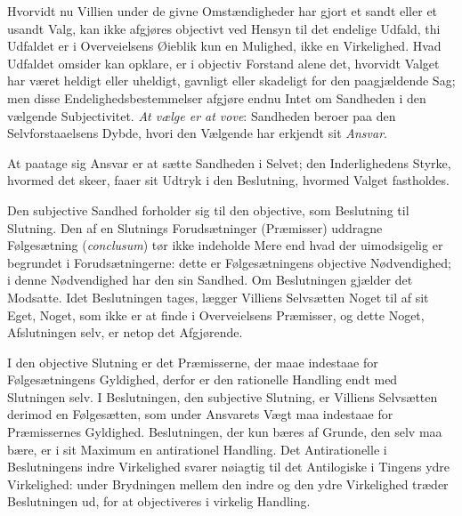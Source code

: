 \documentclass[12pt]{book}
\newcommand{\opage}[1]{\marginnote{\footnotesize\textit{[#1]}}}
\begin{document}
Hvorvidt nu Villien under de givne Omstændigheder har gjort et sandt
eller et usandt Valg, kan ikke afgjøres objectivt ved Hensyn til det
endelige Udfald, thi Udfaldet er i Overveielsens Øieblik kun en
Mulighed, ikke en Virkelighed. Hvad Udfaldet omsider kan opklare, er
i objectiv Forstand alene det, hvorvidt Valget har været heldigt
eller uheldigt, gavnligt eller skadeligt for den paagjældende Sag;
men disse Endelighedsbestemmelser afgjøre endnu Intet om Sandheden i
den vælgende Subjectivitet. \emph{At vælge er at vove}: Sandheden
beroer paa den Selvforstaaelsens Dybde, hvori den Vælgende har
erkjendt sit \emph{Ansvar}.

At paatage sig Ansvar er at sætte Sandheden i Selvet; den
Inderlighedens Styrke, hvormed det skeer, faaer sit Udtryk i den
Beslutning, hvormed Valget fastholdes.

Den subjective Sandhed forholder sig til den objective, som
Beslutning til Slutning. Den af en Slutnings Forudsætninger
(Præmisser) uddragne Følgesætning (\textit{conclusum}) tør ikke
indeholde Mere end hvad der uimodsigelig er begrundet i
Forudsætningerne: dette er Følgesætningens objective Nødvendighed; i
denne Nødvendighed har den sin Sandhed.
\opage{53} Om Beslutningen gjælder det Modsatte. Idet Beslutningen tages,
lægger Villiens Selvsætten Noget til af sit Eget, Noget, som ikke er
at finde i Overveielsens Præmisser, og dette Noget, Afslutningen
selv, er netop det Afgjørende.

I den objective Slutning er det Præmisserne, der maae indestaae for
Følgesætningens Gyldighed, derfor er den rationelle Handling endt
med Slutningen selv. I Beslutningen, den subjective Slutning, er
Villiens Selvsætten derimod en Følgesætten, som under Ansvarets Vægt
maa indestaae for Præmissernes Gyldighed. Beslutningen, der kun
bæres af Grunde, den selv maa bære, er i sit Maximum en antirationel
Handling. Det Antirationelle i Beslutningens indre Virkelighed
svarer nøiagtig til det Antilogiske i Tingens ydre Virkelighed:
under Brydningen mellem den indre og den ydre Virkelighed træder
Beslutningen ud, for at objectiveres i virkelig Handling.
\end{document}
